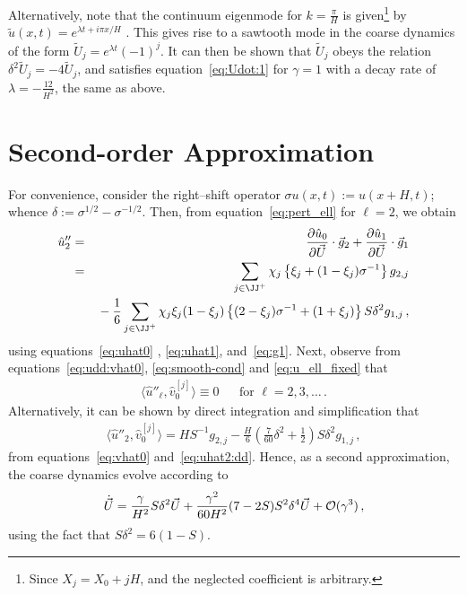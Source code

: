 \documentclass[12pt,a5paper]{article}
\begin{document}
Alternatively, note that the continuum eigenmode for $k=\frac{\pi}{H}$ is given\footnote{Since $X_j=X_0+jH$, and the neglected coefficient is arbitrary.}  by $\tilde{u}(x,t)=e^{\lambda t+i\pi x/H}$ .
This gives rise to a sawtooth mode in the coarse dynamics of the form $\tilde{U}_j=e^{\lambda t}(-1)^{j}$.
It can then be shown that $\tilde{U}_j$ obeys the relation $\delta^2\tilde{U}_j=-4\tilde{U}_j$,
and satisfies equation~\eqref{eq:Udot:1} for $\gamma=1$ with a decay rate of $\lambda=-\frac{12}{H^2}$, the same as above.

\section{Second-order Approximation}
For convenience, consider the right--shift operator $\sigma u(x,t) := u(x+H,t)$;
 whence $\delta:=\sigma^{{1}/{2}}-\sigma^{-{1}/{2}}$.
Then, from equation~\eqref{eq:pert_ell} for $\ell=2$, we obtain
\begin{eqnarray}
  \hat{u}''_2 & = & \D{\vec U}{\hat{u}_0}\cdot{\vec g}_{2}+\D{\vec U}{\hat{u}_1}\cdot{\vec g}_{1}
\nonumber\\
& = & \sum_{j\in\JJ^+}\chi_j\left\{\xi_j+(1-\xi_j)\sigma^{-1}\right\}g_{2,j}
\nonumber\\
&& {}-\frac{1}{6}\sum_{j\in\JJ^+}\chi_j\xi_j(1-\xi_j)\left\{
(2-\xi_j)\sigma^{-1}+(1+\xi_j)
\right\}S\delta^2g_{1,j}\,,
\label{eq:uhat2:dd}
\end{eqnarray}
using equations~\eqref{eq:uhat0} , \eqref{eq:uhat1}, and~\eqref{eq:g1}.
Next, observe 
from equations~\eqref{eq:udd:vhat0}, \eqref{eq:smooth-cond} and \eqref{eq:u_ell_fixed} that
\begin{eqnarray}
\langle\hat{u}''_\ell,\hat{v}_0^{[j]}\rangle\equiv0 && \mbox{for }\ell=2,3,\ldots\,.
\end{eqnarray}
Alternatively, it can be shown by direct integration and simplification that
\begin{eqnarray}
\langle\hat{u}''_2,\hat{v}_0^{[j]}\rangle = HS^{-1}g_{2,j}-\frac{H}{6}\left(\frac{7}{60}\delta^2+\frac{1}{2}\right)S\delta^2g_{1,j}\,,
\end{eqnarray}
from equations~\eqref{eq:vhat0} and~\eqref{eq:uhat2:dd}.
Hence, as a second approximation, the coarse dynamics evolve according to
\begin{eqnarray}
	\dot{\vec U} = \frac{\gamma}{H^2}S\delta^2\vec U 
+ \frac{\gamma^2}{60H^2}(7-2S)S^2\delta^4\vec U
+ {\cal O}(\gamma^3)\,,
\end{eqnarray}
using the fact that $S\delta^2=6(1-S)$.
\end{document}
